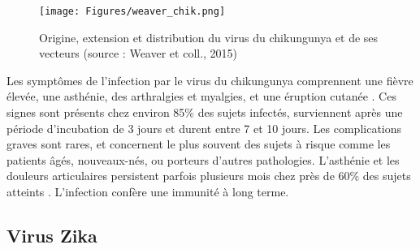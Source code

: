 \begin{figure}[t]
	\centering
	\texttt{[image: Figures/weaver\_chik.png]}
	\caption{Origine, extension et distribution du virus du chikungunya et de ses vecteurs (source : Weaver et coll., 2015)}
	\label{fig:chikworld}
\end{figure}

Les symptômes de l'infection par le virus du chikungunya comprennent une fièvre élevée, une asthénie, des arthralgies et myalgies, et une éruption cutanée \cite{weaver2015chikungunya}. 
Ces signes sont présents chez environ 85\% des sujets infectés, surviennent après une période d'incubation de 3 jours et durent entre 7 et 10 jours.
Les complications graves sont rares, et concernent le plus souvent des sujets à risque comme les patients âgés, nouveaux-nés, ou porteurs d'autres pathologies.
L'asthénie et les douleurs articulaires persistent parfois plusieurs mois chez près de 60\% des sujets atteints \cite{schilte2013chikungunya}.
L'infection confère une immunité à long terme. 


\subsection{Virus Zika}

